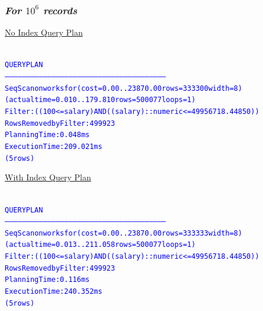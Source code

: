 \documentclass{article}
\begin{document}
    \subsubsection*{\emph{For $10^6$ records}}
    \underline{No Index Query Plan}
    \begin{center}
      {\tiny
      \begin{alltt}
      \textcolor{blue}{
        QUERY PLAN                                                    
        ------------------------------------------------------------------------------------------------------------------
         Seq Scan on worksfor  (cost=0.00..23870.00 rows=333300 width=8) (actual time=0.010..179.810 rows=500077 loops=1)
           Filter: ((100 <= salary) AND ((salary)::numeric <= 49956718.44850))
           Rows Removed by Filter: 499923
         Planning Time: 0.048 ms
         Execution Time: 209.021 ms
        (5 rows)
       }
      \end{alltt}
      }
    \end{center}
    \underline{With Index Query Plan}
    \begin{center}
      {\tiny
      \begin{alltt}
      \textcolor{blue}{
        QUERY PLAN                                                    
        ------------------------------------------------------------------------------------------------------------------
         Seq Scan on worksfor  (cost=0.00..23870.00 rows=333333 width=8) (actual time=0.013..211.058 rows=500077 loops=1)
           Filter: ((100 <= salary) AND ((salary)::numeric <= 49956718.44850))
           Rows Removed by Filter: 499923
         Planning Time: 0.116 ms
         Execution Time: 240.352 ms
        (5 rows)
       }
      \end{alltt}
      }
    \end{center}
\end{document}
